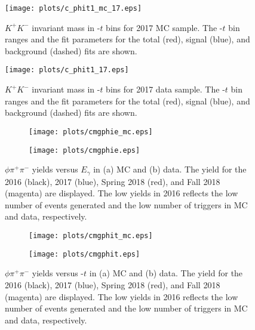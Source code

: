 \begin{figure}[H]
    \centering
    \texttt{[image: plots/c\_phit1\_mc\_17.eps]}
    \caption{\label{fig.y2175.xsec_ul.phi2pi.5}$K^{+}K^{-}$ invariant mass in -$t$ bins for 2017 MC sample. The -$t$ bin ranges and the fit parameters for the total (red), signal (blue), and background (dashed) fits are shown.}
\end{figure}

\begin{figure}[H]
    \centering
    \texttt{[image: plots/c\_phit1\_17.eps]}
    \caption{\label{fig.y2175.xsec_ul.phi2pi.6}$K^{+}K^{-}$ invariant mass in -$t$ bins for 2017 data sample. The -$t$ bin ranges and the fit parameters for the total (red), signal (blue), and background (dashed) fits are shown.}
\end{figure}

\begin{figure}[H]
    \centering
    \begin{subfigure}[b]{0.5\textwidth}
        \texttt{[image: plots/cmgphie\_mc.eps]}
        \caption{}
        \label{fig.y2175.xsec_ul.phi2pi.7.a}
    \end{subfigure}\hfill
    \begin{subfigure}[b]{0.5\textwidth}
        \texttt{[image: plots/cmgphie.eps]}
        \caption{}
        \label{fig.y2175.xsec_ul.phi2pi.7.b}
    \end{subfigure}
    \caption{\label{fig.y2175.xsec_ul.phi2pi.7}$\phi \pi^+ \pi^-$ yields versus $E_{\gamma}$ in (a) MC and (b) data. The yield for the 2016 (black), 2017 (blue), Spring 2018 (red), and Fall 2018 (magenta) are displayed. The low yields in 2016 reflects the low number of events generated and the low number of triggers in MC and data, respectively.}
\end{figure}

\begin{figure}[H]
    \centering
    \begin{subfigure}[b]{0.5\textwidth}
        \texttt{[image: plots/cmgphit\_mc.eps]}
        \caption{}
        \label{fig.y2175.xsec_ul.phi2pi.8.a}
    \end{subfigure}\hfill
    \begin{subfigure}[b]{0.5\textwidth}
        \texttt{[image: plots/cmgphit.eps]}
        \caption{}
        \label{fig.y2175.xsec_ul.phi2pi.8.b}
    \end{subfigure}
    \caption{\label{fig.y2175.xsec_ul.phi2pi.8}$\phi \pi^+ \pi^-$ yields versus -$t$ in (a) MC and (b) data. The yield for the 2016 (black), 2017 (blue), Spring 2018 (red), and Fall 2018 (magenta) are displayed. The low yields in 2016 reflects the low number of events generated and the low number of triggers in MC and data, respectively.}
\end{figure}

